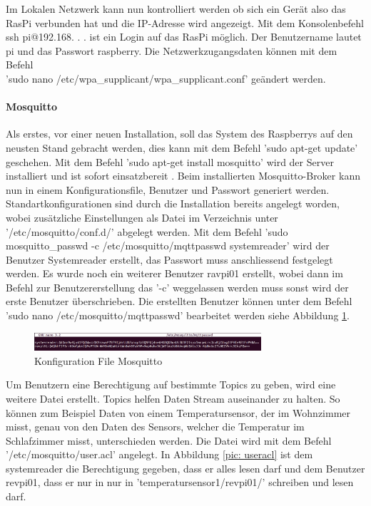 Im Lokalen Netzwerk kann nun kontrolliert werden ob sich ein Gerät also das RasPi verbunden hat und die IP-Adresse wird angezeigt. Mit dem Konsolenbefehl ssh pi@192.168. . . ist ein Login auf das RasPi möglich. Der Benutzername lautet pi und das Passwort raspberry. Die Netzwerkzugangsdaten können mit dem Befehl \\ 
'sudo nano /etc/wpa\_supplicant/wpa\_supplicant.conf'  geändert werden.


\paragraph{Mosquitto}
Als erstes, vor einer neuen Installation, soll das System des Raspberrys auf den neusten Stand gebracht werden, dies kann mit dem Befehl 'sudo apt-get update' geschehen.
Mit dem Befehl 'sudo apt-get install mosquitto' wird der Server installiert und ist sofort einsatzbereit \cite{noauthor_eigener_nodate}. Beim installierten Mosquitto-Broker kann nun in einem Konfigurationsfile, Benutzer und Passwort generiert werden. Standartkonfigurationen sind durch die Installation bereits angelegt worden, wobei zusätzliche Einstellungen als Datei im Verzeichnis unter '/etc/mosquitto/conf.d/' abgelegt werden. Mit dem Befehl 'sudo mosquitto\_passwd -c /etc/mosquitto/mqttpasswd systemreader' wird der Benutzer Systemreader erstellt, das Passwort muss anschliessend festgelegt werden. Es wurde noch ein weiterer Benutzer ravpi01 erstellt, wobei dann im Befehl zur Benutzererstellung das '-c' weggelassen werden muss sonst wird der erste Benutzer überschrieben. Die erstellten Benutzer können unter dem Befehl 'sudo nano /etc/mosquitto/mqttpasswd' bearbeitet werden siehe Abbildung  \ref{pic: KonfigMosquitto}.

\begin{figure}[H]
	\centering
	\includegraphics[width=0.75\textwidth]{graphics/MosquittoKonfig.png}
	\caption{Konfiguration File Mosquitto}
	\label{pic: KonfigMosquitto}
\end{figure}

Um Benutzern eine Berechtigung auf bestimmte Topics zu geben, wird eine weitere Datei erstellt. Topics helfen Daten Stream auseinander zu halten. So können zum Beispiel Daten von einem Temperatursensor, der im Wohnzimmer misst, genau von den Daten des Sensors, welcher die Temperatur im Schlafzimmer misst, unterschieden werden. Die Datei wird mit dem Befehl '/etc/mosquitto/user.acl' angelegt. 
In Abbildung \ref{pic: useracl} ist dem systemreader die Berechtigung gegeben, dass er alles lesen darf und dem Benutzer revpi01, dass er nur in nur in 'temperatursensor1/revpi01/' schreiben und lesen darf. 

